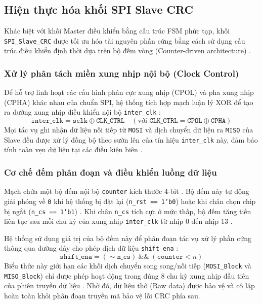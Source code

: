 \subsection{Hiện thực hóa khối SPI Slave CRC}

Khác biệt với khối Master điều khiển bằng cấu trúc FSM phức tạp, khối \texttt{SPI\_Slave\_CRC} được tối ưu hóa tài nguyên phần cứng bằng cách sử dụng cấu trúc điều khiển định thời dựa trên bộ đếm vòng (Counter-driven architecture) .

\subsubsection{Xử lý phân tách miền xung nhịp nội bộ (Clock Control)}
Để hỗ trợ linh hoạt các cấu hình phân cực xung nhịp (CPOL) và pha xung nhịp (CPHA) khác nhau của chuẩn SPI, hệ thống tích hợp mạch luận lý XOR để tạo ra đường xung nhịp điều khiển nội bộ \texttt{inter\_clk} :
\begin{equation}
    \texttt{inter\_clk} = \texttt{sclk} \oplus \texttt{CLK\_CTRL} \quad (\text{với } \texttt{CLK\_CTRL} = \texttt{CPOL} \oplus \texttt{CPHA}) 
\end{equation}
Mọi tác vụ ghi nhận dữ liệu nối tiếp từ \texttt{MOSI} và dịch chuyển dữ liệu ra \texttt{MISO} của Slave đều được xử lý đồng bộ theo sườn lên của tín hiệu \texttt{inter\_clk} này, đảm bảo tính toàn vẹn dữ liệu tại các điều kiện biên .

\subsubsection{Cơ chế đếm phân đoạn và điều khiển luồng dữ liệu}
Mạch chứa một bộ đếm nội bộ \texttt{counter} kích thước 4-bit . Bộ đếm này tự động giải phóng về \texttt{0} khi hệ thống bị đặt lại (\texttt{n\_rst == 1'b0}) hoặc khi chân chọn chip bị ngắt (\texttt{n\_cs == 1'b1}) . Khi chân \texttt{n\_cs} tích cực ở mức thấp, bộ đếm tăng tiến liên tục sau mỗi chu kỳ của xung nhịp \texttt{inter\_clk} từ nhịp 0 đến nhịp 13 . 

Hệ thống sử dụng giá trị của bộ đếm này để phân đoạn tác vụ xử lý phần cứng thông qua đường dây cho phép dịch dữ liệu \texttt{shift\_ena} :
\begin{equation}
    \texttt{shift\_ena} = (\sim \texttt{n\_cs}) \ \&\& \ (\texttt{counter} < n) 
\end{equation}
Biểu thức này giới hạn các khối dịch chuyển song song/nối tiếp (\texttt{MOSI\_Block} và \texttt{MISO\_Block}) chỉ được phép hoạt động trong đúng 8 chu kỳ xung nhịp đầu tiên của phiên truyền dữ liệu . Nhờ đó, dữ liệu thô (Raw data) được bảo vệ và cô lập hoàn toàn khỏi phân đoạn truyền mã bảo vệ lỗi CRC phía sau.


